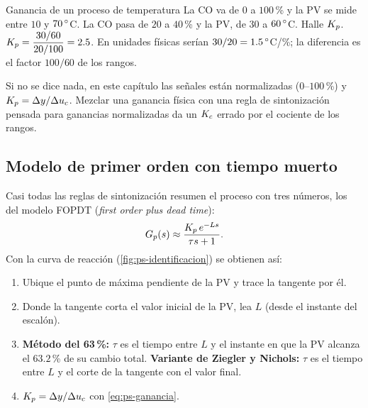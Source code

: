 \begin{ejemplo}[label=ej:ps-ganancia]{Ganancia de un proceso de temperatura}
La CO va de $0$ a $100$\,\% y la PV se mide entre $10$ y $70\,^{\circ}$C. La CO pasa de $20$ a $40$\,\% y la PV, de $30$ a $60\,^{\circ}$C. Halle $K_p$.
\solucion $K_p=\dfrac{30/60}{20/100}=2.5$. En unidades físicas serían $30/20=1.5\,^{\circ}$C/\%; la diferencia es el factor $100/60$ de los rangos.
\end{ejemplo}


\begin{cuidado}
Si no se dice nada, en este capítulo las señales están normalizadas ($0$--$100$\,\%) y $K_p=\Delta y/\Delta u_c$. Mezclar una ganancia física con una regla de sintonización pensada para ganancias normalizadas da un $K_c$ errado por el cociente de los rangos.
\end{cuidado}

\subsection{Modelo de primer orden con tiempo muerto}

Casi todas las reglas de sintonización resumen el proceso con tres números, los del modelo FOPDT (\emph{first order plus dead time}):
\begin{equation}
  G_p(s)\approx\frac{K_p\,e^{-Ls}}{\tau s+1}.
  \label{eq:ps-fopdt}
\end{equation}
Con la curva de reacción (\cref{fig:ps-identificacion}) se obtienen así:
\begin{receta}
\begin{enumerate}
  \item Ubique el punto de máxima pendiente de la PV y trace la tangente por él.
  \item Donde la tangente corta el valor inicial de la PV, lea $L$ (desde el instante del escalón).
  \item \textbf{Método del 63\,\%:} $\tau$ es el tiempo entre $L$ y el instante en que la PV alcanza el $63.2$\,\% de su cambio total. \textbf{Variante de Ziegler y Nichols:} $\tau$ es el tiempo entre $L$ y el corte de la tangente con el valor final.
  \item $K_p=\Delta y/\Delta u_c$ con \eqref{eq:ps-ganancia}.
\end{enumerate}
\end{receta}

